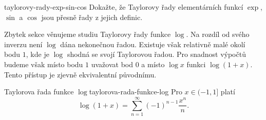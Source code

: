\begin{exercise}{}{taylorovy-rady-exp-sin-cos}
 Dokažte, že Taylorovy řady elementárních funkcí $\exp$, $\sin$ a $\cos$ jsou
 přesně řady z jejich definic.
\end{exercise}

Zbytek sekce věnujeme studiu Taylorovy řady funkce $\log$. Na rozdíl od svého
inverzu není $\log$ dána nekonečnou řadou. Existuje však relativně malé okolí
bodu $1$, kde je $\log$ shodná se svojí Taylorovou řadou. Pro snadnost výpočtů
budeme však místo bodu $1$ uvažovat bod $0$ a místo $\log x$ funkci $\log(1+x)$.
Tento přístup je zjevně ekvivalentní původnímu.

\begin{theorem}{Taylorova řada funkce $\log$}{taylorova-rada-funkce-log}
 Pro $x \in (-1,1]$ platí
 \[
  \log(1+x) = \sum_{n=1}^{\infty} (-1)^{n-1}\frac{x^{n}}{n}.
 \]
\end{theorem}
